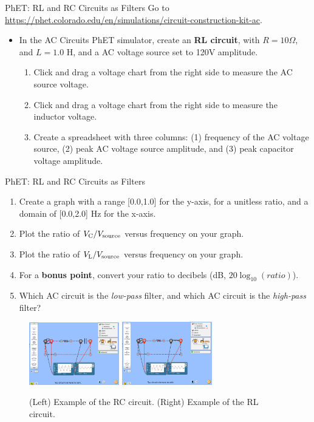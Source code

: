 \documentclass{beamer}
\begin{document}
\begin{frame}{PhET: RL and RC Circuits as Filters}
\footnotesize
Go to \url{https://phet.colorado.edu/en/simulations/circuit-construction-kit-ac}.
\begin{itemize}
\footnotesize
\item In the AC Circuits PhET simulator, create an \textbf{\alert{RL circuit}}, with $R = 10 \Omega$, and $L = 1.0$ H, and a AC voltage source set to 120V amplitude.
\begin{enumerate}
\footnotesize
\item Click and drag a voltage chart from the right side to measure the AC source voltage.
\item Click and drag a voltage chart from the right side to measure the inductor voltage.
\item Create a spreadsheet with three columns: (1) frequency of the AC voltage source, (2) peak AC voltage source amplitude, and (3) peak capacitor voltage amplitude.
\end{enumerate}
\end{itemize}
\end{frame}

\begin{frame}{PhET: RL and RC Circuits as Filters}
\footnotesize
\begin{enumerate}
\item Create a graph with a range [0.0,1.0] for the y-axis, for a unitless ratio, and a domain of [0.0,2.0] Hz for the x-axis.
\item Plot the ratio of $V_{\rm C}/V_{\rm source}$ versus frequency on your graph.
\item Plot the ratio of $V_{\rm L}/V_{\rm source}$ versus frequency on your graph.
\item For a \textbf{bonus point}, convert your ratio to decibels (dB, $20\log_{10}(ratio)$).
\item Which AC circuit is the \textit{low-pass} filter, and which AC circuit is the \textit{high-pass} filter?
\end{enumerate}
\begin{figure}
\centering
\includegraphics[width=0.35\textwidth]{figures/RC_PhET.png}
\includegraphics[width=0.35\textwidth]{figures/RL_PhET.png}
\caption{\label{fig:RC_RL_PhET} \footnotesize (Left) Example of the RC circuit. (Right) Example of the RL circuit.}
\end{figure}
\end{frame}
\end{document}
